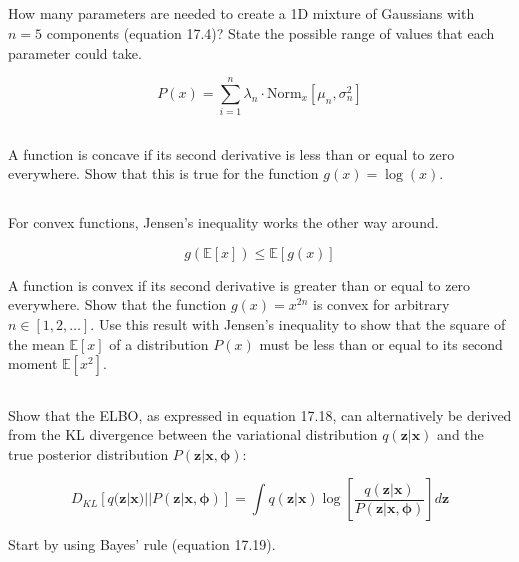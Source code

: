 \documentclass[12pt]{report}
\begin{document}
\subsection{}
\begin{mdframed}
    How many parameters are needed to create a 1D mixture of Gaussians with $n=5$ components (equation 17.4)? State the possible range of values that each parameter could take.

    \begin{equation*}
        P(x) = \sum_{i=1}^{n} \lambda_{n} \cdot \text{Norm}_{x}[\mu_{n}, \sigma_{n}^{2}]
        \label{eq:17.4}
        \tag{17.4}
    \end{equation*}
\end{mdframed}

\subsection{}
\begin{mdframed}
    A function is concave if its second derivative is less than or equal to zero everywhere. Show that this is true for the function $g(x) = \log(x)$.
\end{mdframed}

\subsection{}
\begin{mdframed}
    For convex functions, Jensen's inequality works the other way around.

    \begin{equation*}
        g(\mathbb{E}[x]) \leq \mathbb{E}[g(x)]
        \tag{17.31}
    \end{equation*}

    A function is convex if its second derivative is greater than or equal to zero everywhere. Show that the function $g(x) = x^{2n}$ is convex for arbitrary $n \in [1,2, \dots]$. Use this result with Jensen's inequality to show that the square of the mean $\mathbb{E}[x]$ of a distribution $P(x)$ must be less than or equal to its second moment $\mathbb{E}[x^{2}]$.
\end{mdframed}

\subsection{}
\begin{mdframed}
    Show that the ELBO, as expressed in equation 17.18, can alternatively be derived from the KL divergence between the variational distribution $q(\mathbf{z}| \mathbf{x})$ and the true posterior distribution $P(\mathbf{z}|\mathbf{x}, \boldsymbol{\phi})$:

    \begin{equation*}
        D_{KL}[q(\mathbf{z}|\mathbf{x})||P(\mathbf{z}|\mathbf{x}, \boldsymbol{\phi})] = \int q(\mathbf{z}|\mathbf{x}) \log \left[ \frac{q(\mathbf{z}|\mathbf{x})}{P(\mathbf{z}|\mathbf{x}, \boldsymbol{\phi})} \right] d\mathbf{z}
        \tag{17.32}
    \end{equation*}

    Start by using Bayes' rule (equation 17.19).
\end{mdframed}
\end{document}

